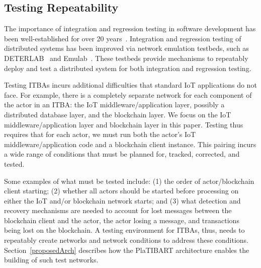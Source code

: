 \subsection{Testing Repeatability}

The importance of integration and regression testing in software development has been well-established for over 20 years~\cite{rothermel2001prioritizing,agrawal1993incremental,leung1990study}. Integration and regression testing of distributed systems has been improved via network emulation testbeds, such as DETERLAB~\cite{mirkovic2012teachingDETERLAB} and Emulab~\cite{siaterlis2013useEmulab}. These testbeds provide mechanisms to repeatably deploy and test a distributed system for both integration and regression testing.

Testing ITBAs incurs additional difficulties that standard IoT applications do not face. For example, there is a completely separate network for each component of the actor in an ITBA: the IoT middleware/application layer, possibly a distributed database layer, and the blockchain layer.  We focus on the IoT middleware/application layer and blockchain layer in this paper. Testing thus requires that for each actor, we must run both the actor's IoT middleware/application code and a blockchain client instance. This pairing incurs a wide range of conditions that must be planned for, tracked, corrected, and tested. 

Some examples of what must be tested include: (1) the order of actor/blockchain client starting; (2) whether all actors should be started before processing on either the IoT and/or blockchain network starts; and (3) what detection and recovery mechanisms are needed to account for lost messages between the blockchain client and the actor, the actor losing a message, and transactions being lost on the blockchain. A testing environment for ITBAs, thus, needs to repeatably create networks and network conditions to address these conditions. Section~\ref{proposedArch} describes how the PlaTIBART architecture enables the building of such test networks. 


